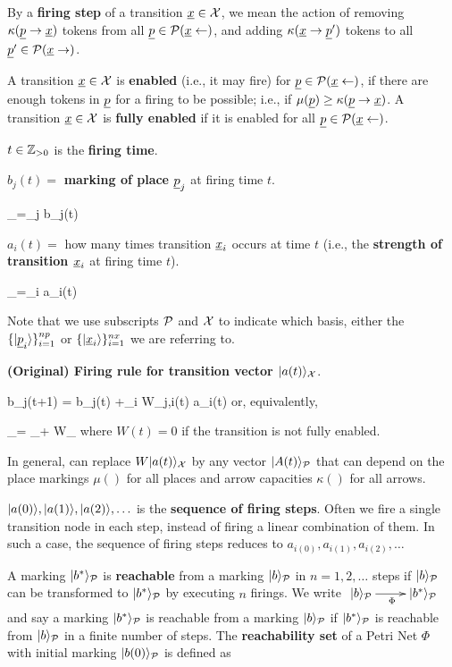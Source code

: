 By a {\bf firing step} of a transition $\rvx\in \calx$, we mean the action of removing $\kappa(\rvp\rarrow \rvx)$
tokens from all $\rvp\in\calp(\rvx\larrow)$, and adding $\kappa(\rvx\rarrow\rvp')$ tokens to all $\rvp'\in\calp(\rvx\rarrow)$.

A transition $\rvx\in \calx$ is {\bf enabled} 
(i.e., it may fire)
for $\rvp\in \calp(\rvx\larrow)$, if there are enough tokens in 
$\rvp$ for a firing to be possible; i.e., if $\mu(\rvp) \geq \kappa(\rvp\rarrow \rvx)$. A transition $\rvx\in\calx$ is {\bf fully enabled} if it is enabled for all $\rvp\in \calp(\rvx\larrow)$.

$t \in {\mathbb{Z}}_{>0}$ is the {\bf firing time}.

$b_j(t) =$ {\bf marking of place $\rvp_j$} at firing time $t$.

\beq
{}_\calp =\sum_j b_j(t) 
\eeq

$a_i(t) =$ how many times  transition $\rvx_i$
occurs at time $t$
(i.e., the {\bf strength of transition $\rvx_i$}
at firing time $t$).

\beq
{}_\calx =\sum_i a_i(t) 
\eeq

Note that we use subscripts ${\cal P}$ and ${\cal X}$ to
indicate which basis, either the $\{\ket{\rvp_i}\}_{i=1}^{np}$
or  $\{\ket{\rvx_i}\}_{i=1}^{nx}$
we are referring to.

{\bf (Original) Firing rule
for transition vector $|a(t)\rangle_{\cal X}$}.

\beq
b_j(t+1) = b_j(t)
+\sum_i W_{j,i}(t) a_i(t)
\eeq
or, equivalently,

 
\beq
{}_\calp =
_\calp +
W_\calx
\label{eq-firing-stepper}
\eeq
where $W(t)=0$ if 
the transition
is not fully enabled.
 
 In general, can replace $W|a(t)\rangle_{\cal X}$ by
 any vector 
 $|A(t)\rangle_{\cal P}$ that can depend on
 the place markings $\mu()$
 for all places
 and
 arrow capacities
 $\kappa()$
 for
 all arrows.

$|a(0)\rangle, |a(1)\rangle, |a(2)\rangle,
\ldots$ is the {\bf sequence of firing
steps}.
Often we fire a single transition node
in each step,
instead of firing a linear combination 
of them. In such a case, the
sequence of firing steps reduces to
$a_{i(0)}, a_{i(1)}, a_{i(2)},
\ldots$


A marking $|b^*\rangle_{\cal P}$ is {\bf reachable} from a marking  $|b\rangle_{\cal P}$ in 
$n = 1, 2, \ldots$  steps if
$|b\rangle_{\cal P}$ can be transformed to $|b^*\rangle_{\cal P}$ by executing $n$ firings. We write 
$\xymatrix{\ket{b}_\calp\ar[r]_\Phi& \ket{b^*}_\calp}$ and say a
marking $|b^*\rangle_{\cal P}$ is reachable from a marking
$|b\rangle_{\cal P}$ if $|b^*\rangle_{\cal P}$ is reachable from 
$|b\rangle_{\cal P}$ in a finite
number of steps.
The {\bf reachability set} of a Petri Net $\Phi$ with 
initial marking $|b(0)\rangle_{\cal P}$ is defined as

